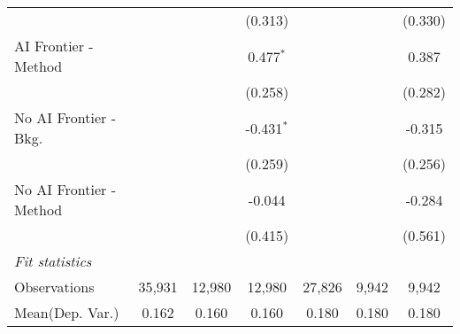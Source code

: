 \begin{tabular}{lcccccc}
                           &                &                & (0.313)       &                &                & (0.330)\\   
   AI Frontier - Method    &                &                & 0.477$^{*}$   &                &                & 0.387\\   
                           &                &                & (0.258)       &                &                & (0.282)\\   
   No AI Frontier - Bkg.   &                &                & -0.431$^{*}$  &                &                & -0.315\\   
                           &                &                & (0.259)       &                &                & (0.256)\\   
   No AI Frontier - Method &                &                & -0.044        &                &                & -0.284\\   
                           &                &                & (0.415)       &                &                & (0.561)\\   
   \midrule
   \emph{Fit statistics}\\
   Observations            & 35,931         & 12,980         & 12,980        & 27,826         & 9,942          & 9,942\\  
Mean(Dep. Var.) & 0.162 & 0.160 & 0.160 & 0.180 & 0.180 & 0.180 \\
   

\end{tabular}
